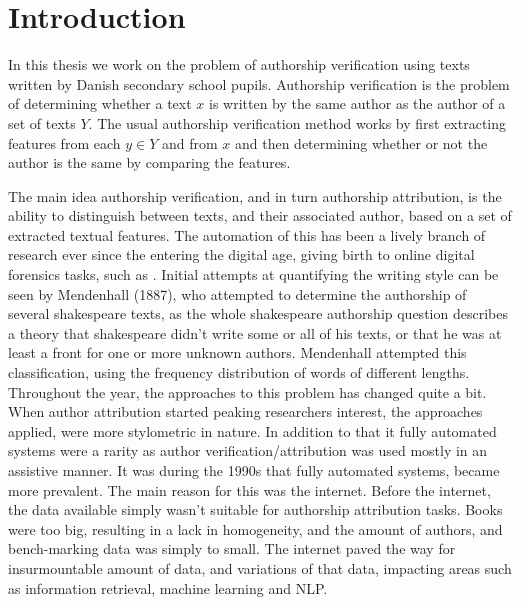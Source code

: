 \section{Introduction} \label{sec:introduction}

In this thesis we work on the problem of authorship verification using texts
written by Danish secondary school pupils. Authorship verification is the
problem of determining whether a text $x$ is written by the same author as the
author of a set of texts $Y$. The usual authorship verification method works by
first extracting features from each $y \in Y$ and from $x$ and then determining
whether or not the author is the same by comparing the features.

The main idea authorship verification, and in turn authorship attribution,
is the ability to distinguish between texts, and their associated author,
based on a set of extracted textual features. The automation of this has been
a lively branch of research ever since the entering the digital age, giving
birth to online digital forensics tasks, such as \cite{pan:2015}. Initial
attempts at quantifying the writing style can be seen by Mendenhall (1887),
who attempted to determine the authorship of several shakespeare texts, as the
whole shakespeare authorship question describes a theory that shakespeare didn't
write some or all of his texts, or that he was at least a front for one or more
unknown authors. Mendenhall attempted this classification, using the frequency
distribution of words of different lengths. Throughout the year, the approaches
to this problem has changed quite a bit. When author attribution started
peaking researchers interest, the approaches applied, were more stylometric in
nature. In addition to that it fully automated systems were a rarity as author
verification/attribution was used mostly in an assistive manner. It was during
the 1990s that fully automated systems, became more prevalent. The main reason
for this was the internet. Before the internet, the data available simply wasn't
suitable for authorship attribution tasks. Books were too big, resulting in
a lack in homogeneity, and the amount of authors, and bench-marking data was
simply to small. The internet paved the way for insurmountable amount of data,
and variations of that data, impacting areas such as information retrieval,
machine learning and \gls{NLP}.

